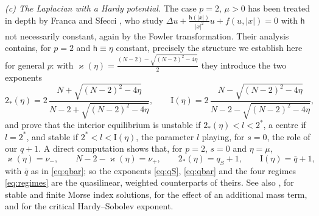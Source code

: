 \documentclass[11pt,reqno]{amsart}
\numberwithin{equation}{section}
\theoremstyle{plain}
\theoremstyle{definition}
\begin{document}
\smallskip
\noindent\emph{(c) The Laplacian with a Hardy potential.} The case $p=2$,
$\mu>0$ has been treated in depth by Franca and Sfecci \cite{FrancaSfecci},
who study $\Delta u+\frac{\mathsf h(|x|)}{|x|^{2}}u+f(u,|x|)=0$ with
$\mathsf h$ not necessarily constant, again by the Fowler transformation. Their
analysis contains, for $p=2$ and $\mathsf h\equiv\eta$ constant, precisely the
structure we establish here for general $p$: with
$\varkappa(\eta)=\frac{(N-2)-\sqrt{(N-2)^{2}-4\eta}}{2}$ they introduce the two
exponents
\[
2_{*}(\eta)=2\,\frac{N+\sqrt{(N-2)^{2}-4\eta}}{N-2+\sqrt{(N-2)^{2}-4\eta}},
\qquad
\mathrm I(\eta)=2\,\frac{N-\sqrt{(N-2)^{2}-4\eta}}{N-2-\sqrt{(N-2)^{2}-4\eta}} ,
\]
and prove that the interior equilibrium is unstable if
$2_{*}(\eta)<l<2^{*}$, a centre if $l=2^{*}$, and stable if
$2^{*}<l<\mathrm I(\eta)$, the parameter $l$ playing, for $s=0$, the role of
our $q+1$. A direct computation shows that, for $p=2$, $s=0$ and $\eta=\mu$,
\begin{equation}\label{eq:matchFS}
\varkappa(\eta)=\nu_{-},\qquad
N-2-\varkappa(\eta)=\nu_{+},\qquad
2_{*}(\eta)=q_{S}+1,\qquad
\mathrm I(\eta)=\bar q+1 ,
\end{equation}
with $\bar q$ as in \eqref{eq:qbar}; so the exponents \eqref{eq:qS},
\eqref{eq:qbar} and the four regimes \eqref{eq:regimes} are the quasilinear,
weighted counterparts of theirs. See also \cite{Bae,CirsteaFarcaseanu,WeiDu,FengTanWei},
\cite{JeongLee2013} for stable and finite Morse index solutions,
\cite{HeXiang2016a} for the effect of an additional mass term, and
\cite{AFP,Xiang2015,Xiang2017,OSV,HeXiang2016b} for the critical
Hardy--Sobolev exponent.
\end{document}
